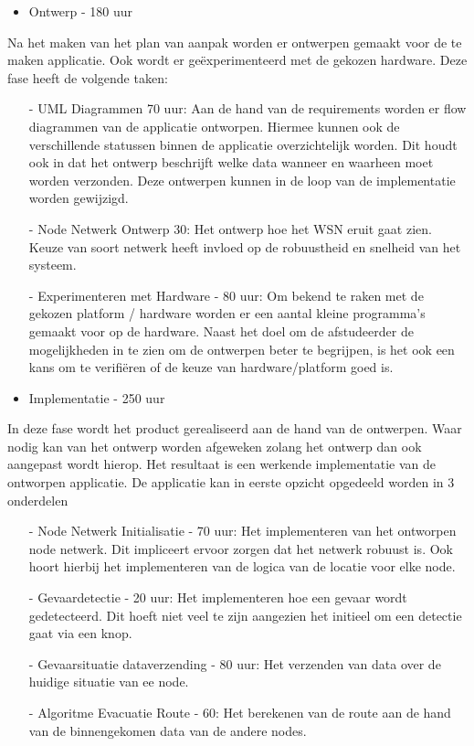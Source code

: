 \begin{itemize}
\item Ontwerp - 180 uur
\end{itemize}
Na het maken van het plan van aanpak worden er ontwerpen gemaakt voor de te maken applicatie. Ook wordt er geëxperimenteerd met de gekozen hardware. Deze fase heeft de volgende taken:

\begin{itemize}
\item[-] UML Diagrammen 70 uur: Aan de hand van de requirements worden er flow diagrammen van de applicatie ontworpen. Hiermee kunnen ook de verschillende statussen binnen de applicatie overzichtelijk worden. Dit houdt ook in dat het ontwerp beschrijft welke data wanneer en waarheen moet worden verzonden. Deze ontwerpen kunnen in de loop van de implementatie worden gewijzigd.

\item[-] Node Netwerk Ontwerp 30: Het ontwerp hoe het WSN eruit gaat zien. Keuze van soort netwerk heeft invloed op de robuustheid en snelheid van het systeem.

\item[-] Experimenteren met Hardware - 80 uur: Om bekend te raken met de gekozen platform / hardware worden er een aantal kleine programma's gemaakt voor op de hardware. Naast het doel om de afstudeerder de mogelijkheden in te zien om de ontwerpen beter te begrijpen, is het ook een kans om te verifiëren of de keuze van hardware/platform goed is.
\end{itemize}

\begin{itemize}
\item Implementatie - 250 uur
\end{itemize}
In deze fase wordt het product gerealiseerd aan de hand van de ontwerpen. Waar nodig kan van het ontwerp worden afgeweken zolang het ontwerp dan ook aangepast wordt hierop. Het resultaat is een werkende implementatie van de ontworpen applicatie. De applicatie kan in eerste opzicht opgedeeld worden in 3 onderdelen 
\begin{itemize}
\item[-] Node Netwerk Initialisatie - 70 uur: Het implementeren van het ontworpen node netwerk. Dit impliceert ervoor zorgen dat het netwerk robuust is. Ook hoort hierbij het implementeren van de logica van de locatie voor elke node.
\item[-] Gevaardetectie - 20 uur: Het implementeren hoe een gevaar wordt gedetecteerd. Dit hoeft niet veel te zijn aangezien het initieel om een detectie gaat via een knop.
\item[-] Gevaarsituatie dataverzending - 80 uur: Het verzenden van data over de huidige situatie van ee node. 
\item[-] Algoritme Evacuatie Route - 60: Het berekenen van de route aan de hand van de binnengekomen data van de andere nodes. 
\end{itemize}

